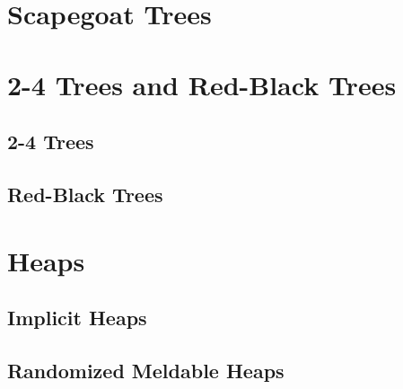 \documentclass{book}
\begin{document}
\chapter{Scapegoat Trees}

\chapter{2-4 Trees and Red-Black Trees}
\section{2-4 Trees}
\section{Red-Black Trees}

\chapter{Heaps}
\section{Implicit Heaps}
\section{Randomized Meldable Heaps}
\end{document}
